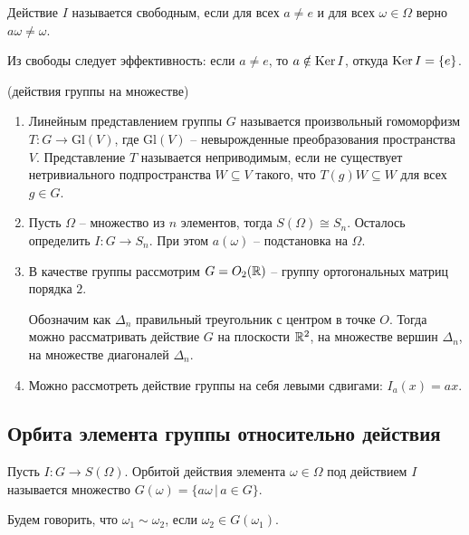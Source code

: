 \begin{definition}
    Действие $I$ называется свободным, если для всех $a \neq e$ и для всех $\omega \in \Omega$ верно $a\omega \neq \omega$.
\end{definition}

\begin{note}
    Из свободы следует эффективность: если $a \neq e$, то $a \notin \operatorname{Ker} I$, откуда $\operatorname{Ker} I = \{e\}$.
\end{note}

\begin{example}(действия группы на множестве)~
    \begin{enumerate}
        \item Линейным представлением группы $G$ называется произвольный гомоморфизм $T: G \to \text{Gl}(V)$,
        где $\text{Gl}(V)$ -- невырожденные преобразования пространства $V$. Представление $T$ называется 
        неприводимым, если не существует нетривиального подпространства $W \subseteq V$ такого, что
        $T(g)W \subseteq W$ для всех $g \in G$.
        \item Пусть $\Omega$ -- множество из $n$ элементов, тогда $S(\Omega) \cong S_n$. Осталось
        определить $I: G \to S_n$. При этом $a(\omega)$ -- подстановка на $\Omega$.
        \item В качестве группы рассмотрим $G = O_2(\mathbb{R})$ -- группу ортогональных матриц порядка $2$.
        
        Обозначим как $\Delta_n$ правильный треугольник с центром в точке $O$. Тогда можно рассматривать 
        действие $G$ на плоскости $\mathbb{R}^2$, на множестве вершин $\Delta_n$, на множестве диагоналей $\Delta_n$.
        \item Можно рассмотреть действие группы на себя левыми сдвигами: $I_a(x) = ax$.
    \end{enumerate}
\end{example}

\subsection{Орбита элемента группы относительно действия}

\begin{definition}
    Пусть $I: G \to S(\Omega)$. Орбитой действия элемента $\omega \in \Omega$ под действием $I$
    называется множество $G(\omega) = \{a\omega \, | \, a \in G\}$.
\end{definition}

\begin{definition}
    Будем говорить, что $\omega_1 \sim \omega_2$, если $\omega_2 \in G(\omega_1)$.
\end{definition}

